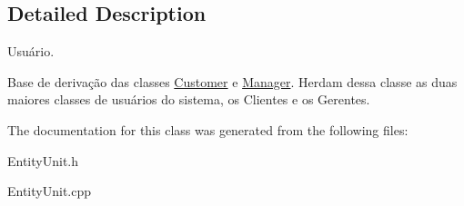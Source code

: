 \subsection{Detailed Description}
Usuário. 

Base de derivação das classes \hyperlink{classCustomer}{Customer} e \hyperlink{classManager}{Manager}. Herdam dessa classe as duas maiores classes de usuários do sistema, os Clientes e os Gerentes. 

The documentation for this class was generated from the following files\-:\begin{DoxyCompactItemize}
\item 
Entity\-Unit.\-h\item 
Entity\-Unit.\-cpp\end{DoxyCompactItemize}
